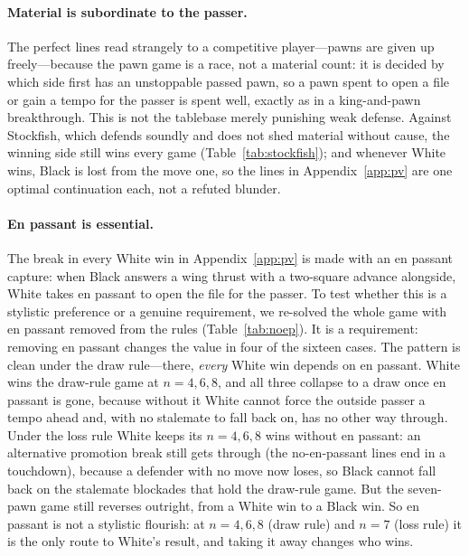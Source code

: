 \documentclass[11pt]{article}
\theoremstyle{plain}
\theoremstyle{definition}
\begin{document}
\paragraph{Material is subordinate to the passer.} The perfect lines read
strangely to a competitive player---pawns are given up freely---because the pawn
game is a race, not a material count: it is decided by which side first has an
unstoppable passed pawn, so a pawn spent to open a file or gain a tempo for the
passer is spent well, exactly as in a king-and-pawn breakthrough. This is not the
tablebase merely punishing weak defense. Against Stockfish, which defends soundly
and does not shed material without cause, the winning side still wins every game
(Table~\ref{tab:stockfish}); and whenever White wins, Black is lost from the move
one, so the lines in Appendix~\ref{app:pv} are one optimal continuation each, not
a refuted blunder.

\paragraph{En passant is essential.} The break in every White win in
Appendix~\ref{app:pv} is made with an en passant capture: when Black answers a wing
thrust with a two-square advance alongside, White takes en passant to open the file
for the passer. To test whether this is a stylistic preference or a genuine
requirement, we re-solved the whole game with en passant removed from the rules
(Table~\ref{tab:noep}). It is a requirement: removing en passant changes the value
in four of the sixteen cases. The pattern is clean under the draw rule---there,
\emph{every} White win depends on en passant. White wins the draw-rule game at
$n=4,6,8$, and all three collapse to a draw once en passant is gone, because
without it White cannot force the outside passer a tempo ahead and, with no
stalemate to fall back on, has no other way through. Under the loss rule White keeps
its $n=4,6,8$ wins without en passant: an alternative promotion break still gets
through (the no-en-passant lines end in a touchdown), because a defender with no
move now loses, so Black cannot fall back on the stalemate blockades that hold the
draw-rule game. But the seven-pawn game still reverses outright, from a White win to
a Black win. So en passant is not a stylistic flourish: at $n=4,6,8$ (draw rule) and
$n=7$ (loss rule) it is the only route to White's result, and taking it away changes
who wins.
\end{document}
